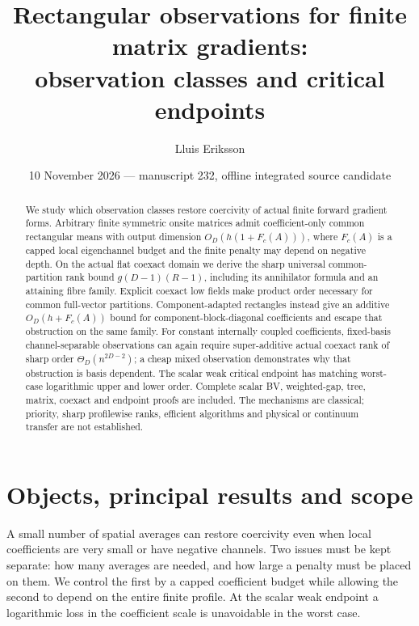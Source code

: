 \documentclass[11pt]{article}
\title{Rectangular observations for finite matrix gradients:\\observation classes and critical endpoints}
\author{Lluis Eriksson}
\date{10 November 2026 --- manuscript 232, offline integrated source candidate}
\begin{document}
\maketitle
\begin{abstract}
We study which observation classes restore coercivity of actual finite forward
gradient forms. Arbitrary finite symmetric onsite matrices admit coefficient-only
common rectangular means with output dimension $O_D(h(1+F_c(A)))$, where $F_c(A)$
is a capped local eigenchannel budget and the finite penalty may depend on
negative depth. On the actual flat coexact domain we derive the sharp universal
common-partition rank bound $g(D-1)(R-1)$, including its annihilator formula and
an attaining fibre family. Explicit coexact low fields make product order
necessary for common full-vector partitions. Component-adapted rectangles instead
give an additive $O_D(h+F_c(A))$ bound for component-block-diagonal coefficients
and escape that obstruction on the same family. For constant internally coupled
coefficients, fixed-basis channel-separable observations can again require
super-additive actual coexact rank of sharp order $\Theta_D(n^{2D-2})$; a cheap
mixed observation demonstrates why
that obstruction is basis dependent. The scalar weak critical endpoint has
matching worst-case logarithmic upper and lower order. Complete scalar BV,
weighted-gap, tree, matrix, coexact and endpoint proofs are included.
The mechanisms are classical; priority, sharp profilewise ranks, efficient
algorithms and physical or continuum transfer are not established.
\end{abstract}

\section{Objects, principal results and scope}\label{sec:main}
A small number of spatial averages can restore coercivity even when local
coefficients are very small or have negative channels. Two issues must be
kept separate: how many averages are needed, and how large a penalty must be
placed on them. We control the first by a capped coefficient budget while
allowing the second to depend on the entire finite profile. At the scalar
weak endpoint a logarithmic loss in the coefficient scale is unavoidable in
the worst case.
\end{document}
